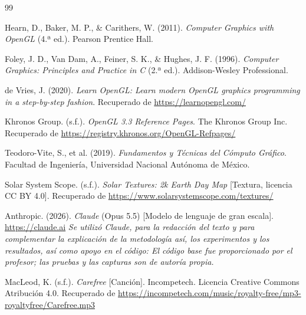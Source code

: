 
\renewcommand{\refname}{Referencias Bibliográficas}
\begin{thebibliography}{99}

Hearn, D., Baker, M. P., \& Carithers, W. (2011). \textit{Computer Graphics with OpenGL} (4.ª ed.). Pearson Prentice Hall.

Foley, J. D., Van Dam, A., Feiner, S. K., \& Hughes, J. F. (1996). \textit{Computer Graphics: Principles and Practice in C} (2.ª ed.). Addison-Wesley Professional.

de Vries, J. (2020). \textit{Learn OpenGL: Learn modern OpenGL graphics programming in a step-by-step fashion}. Recuperado de \url{https://learnopengl.com/}

Khronos Group. (s.f.). \textit{OpenGL 3.3 Reference Pages}. The Khronos Group Inc. Recuperado de \url{https://registry.khronos.org/OpenGL-Refpages/}

Teodoro-Vite, S., et al. (2019). \textit{Fundamentos y Técnicas del Cómputo Gráfico}. Facultad de Ingeniería, Universidad Nacional Autónoma de México.

Solar System Scope. (s.f.). \textit{Solar Textures: 2k Earth Day Map} [Textura, licencia CC BY 4.0]. Recuperado de \url{https://www.solarsystemscope.com/textures/}

Anthropic. (2026). \textit{Claude} (Opus 5.5) [Modelo de lenguaje de gran escala]. \url{https://claude.ai}
\textit{Se utilizó Claude, para la redacción del texto y para complementar la explicación de la metodología así, los experimentos y los resultados, así como apoyo en el código: El código base fue proporcionado por el profesor; las pruebas y las capturas son de autoría propia.}

MacLeod, K. (s.f.). \textit{Carefree} [Canción]. Incompetech. Licencia Creative Commons Atribución 4.0. Recuperado de \url{https://incompetech.com/music/royalty-free/mp3-royaltyfree/Carefree.mp3}

\end{thebibliography}
